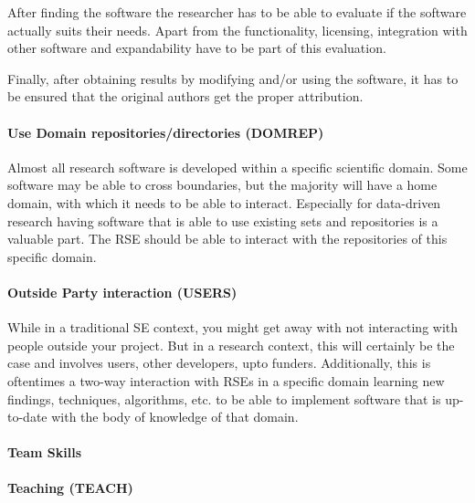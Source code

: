 \documentclass[a4paper
]{article}
\begin{document}
After finding the software the researcher has to be able to evaluate if
the software actually suits their needs. Apart from the functionality,
licensing, integration with other software and expandability have to be
part of this evaluation.

Finally, after obtaining results by modifying and/or using the software,
it has to be ensured that the original authors get the proper
attribution.

\hypertarget{use-domain-repositoriesdirectories-domrep}{%
\paragraph{Use Domain repositories/directories
(DOMREP)}\label{use-domain-repositoriesdirectories-domrep}}

Almost all research software is developed within a specific scientific
domain. Some software may be able to cross boundaries, but the majority
will have a home domain, with which it needs to be able to interact.
Especially for data-driven research having software that is able to use
existing sets and repositories is a valuable part. The RSE should be
able to interact with the repositories of this specific domain.

\hypertarget{outside-party-interaction-users}{%
\paragraph{Outside Party interaction
(USERS)}\label{outside-party-interaction-users}}

While in a traditional SE context, you might get away with not
interacting with people outside your project. But in a research context,
this will certainly be the case and involves users, other developers,
upto funders. Additionally, this is oftentimes a two-way interaction
with RSEs in a specific domain learning new findings, techniques,
algorithms, etc. to be able to implement software that is up-to-date
with the body of knowledge of that domain.

\hypertarget{team-skills}{%
\paragraph{Team Skills}\label{team-skills}}

\hypertarget{teaching-teach}{%
\paragraph{Teaching (TEACH)}\label{teaching-teach}}
\end{document}
